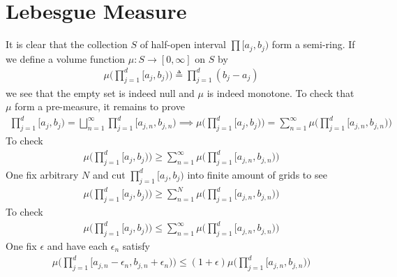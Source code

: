 \documentclass{report}
\begin{document}
\section{Lebesgue Measure}
\begin{abstract}
This section demonstrate a construction of Lebesgue measure with usage of . For discussion of non Lebesgue measurable set, see , and to see that continuous function may not preserve Lebesgue measurability, see .  
\end{abstract}
\begin{mdframed}
It is clear that the collection $S$ of half-open interval $\prod [a_j,b_j)$ form a semi-ring. If we define a volume function $\mu : S\rightarrow [0,\infty]$ on  $S$ by 
 \begin{align*}
\mu \Big( \prod_{j=1}^d [a_j,b_j) \Big)\triangleq  \prod_{j=1}^d (b_j-a_j)
\end{align*}
we see that the empty set is indeed null and $\mu$ is indeed monotone. To check that $\mu$ form a pre-measure, it remains to prove 
\begin{align*}
\prod_{j=1}^d [a_j,b_j)= \bigsqcup_{n=1}^{\infty} \prod_{j=1}^d [a_{j,n},b_{j,n}) \implies \mu \Big(\prod_{j=1}^d [a_j,b_j) \Big)= \sum_{n=1}^{\infty} \mu \Big(\prod_{j=1}^d [a_{j,n},b_{j,n}) \Big)
\end{align*}
To check 
\begin{align}
\mu \Big(\prod_{j=1}^d [a_j,b_j) \Big) \geq \sum_{n=1}^{\infty} \mu \Big(\prod_{j=1}^d [a_{j,n},b_{j,n}) \Big)
\end{align}
One fix arbitrary $N$ and cut  $\prod_{j=1}^d [a_j,b_j)$ into finite amount of grids to see  
\begin{align*}
\mu \Big(\prod_{j=1}^d [a_j,b_j) \Big) \geq \sum_{n=1}^{N} \mu \Big(\prod_{j=1}^d [a_{j,n},b_{j,n}) \Big)
\end{align*}
To check 
\begin{align}
\label{58}
\mu \Big(\prod_{j=1}^d [a_j,b_j) \Big)\leq \sum_{n=1}^{\infty} \mu \Big(\prod _{j=1}^d [a_{j,n},b_{j,n}) \Big)
\end{align}
One fix $\epsilon$ and have each $\epsilon _n$ satisfy 
\begin{align*}
  \mu \Big(\prod_{j=1}^d [a_{j,n}-\epsilon_n , b_{j,n}+\epsilon_n) \Big) \leq (1+\epsilon )\mu  \Big(\prod_{j=1}^d [a_{j,n},b_{j,n}) \Big)
\end{align*}

\end{mdframed}
\end{document}
